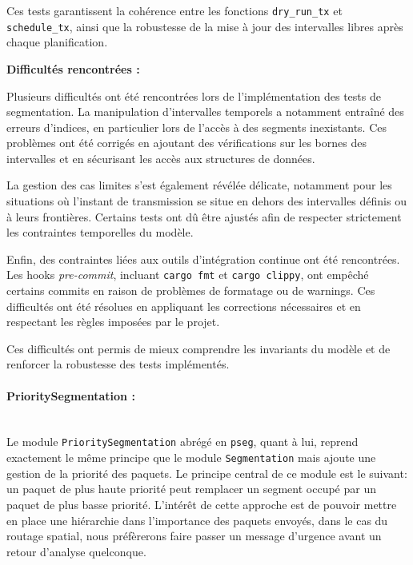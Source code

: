 \documentclass{article}
\begin{document}
Ces tests garantissent la cohérence entre les fonctions \texttt{dry\_run\_tx} et \texttt{schedule\_tx}, ainsi que la robustesse de la mise à jour des intervalles libres après chaque planification.

\vspace{0.3cm}

\textbf{Difficultés rencontrées :}

Plusieurs difficultés ont été rencontrées lors de l’implémentation des tests de segmentation. La manipulation d’intervalles temporels a notamment entraîné des erreurs d’indices, en particulier lors de l’accès à des segments inexistants. Ces problèmes ont été corrigés en ajoutant des vérifications sur les bornes des intervalles et en sécurisant les accès aux structures de données.

La gestion des cas limites s’est également révélée délicate, notamment pour les situations où l’instant de transmission se situe en dehors des intervalles définis ou à leurs frontières. Certains tests ont dû être ajustés afin de respecter strictement les contraintes temporelles du modèle.

Enfin, des contraintes liées aux outils d’intégration continue ont été rencontrées. Les hooks \textit{pre-commit}, incluant \texttt{cargo fmt} et \texttt{cargo clippy}, ont empêché certains commits en raison de problèmes de formatage ou de warnings. Ces difficultés ont été résolues en appliquant les corrections nécessaires et en respectant les règles imposées par le projet.

Ces difficultés ont permis de mieux comprendre les invariants du modèle et de renforcer la robustesse des tests implémentés.\\

\paragraph{PrioritySegmentation :}~\\
Le module \texttt{PrioritySegmentation} abrégé en \texttt{pseg}, quant à lui, reprend exactement le même principe 
que le module \texttt{Segmentation} mais ajoute une gestion de la priorité des paquets.
Le principe central de ce module est le suivant: un paquet de plus haute priorité peut remplacer un segment occupé par un paquet
de plus basse priorité. L'intérêt de cette approche est de pouvoir mettre en place une hiérarchie dans l'importance des paquets envoyés,
dans le cas du routage spatial, nous préfèrerons faire passer un message d'urgence avant un retour d'analyse quelconque.
\end{document}
